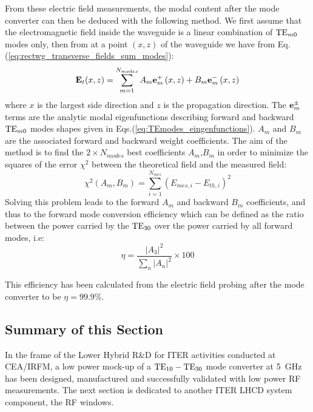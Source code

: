 From these electric field measurements, the modal content after the mode converter can then be deduced with the following method. We first assume that the electromagnetic field inside the waveguide is a linear combination of ${\mathrm{TE}}_{m0}$ modes only, then from at a point $(x,z)$ of the waveguide we have from Eq.(\ref{eq:rectwg_transverse_fields_sum_modes}):
\begin{equation}
{\mathbf E}_{t}(x,z)
	=
	\sum_{m=1}^{N_{modes}}
	A_{m} {\mathbf e}_{m}^{+} \left(x,z\right) + B_{m} {\mathbf e}_{m}^{-} \left(x,z\right) 
\end{equation}
where $x$ is the largest side direction and $z$ is the propagation direction. The ${\mathbf e}_{m}^{\pm}$ terms are the analytic modal eigenfunctions describing forward and backward ${\mathrm{TE}}_{m0}$ modes shapes given in Eqs.(\ref{eq:TEmodes_eingenfunctions}). $A_{m}$ and $B_{m}$ are the associated forward and backward weight coefficients.  The aim of the method is to find the $2\times N_{modes}$ best coefficients $A_{m}$,$B_{m}$  in order to minimize the squares of the error $\chi^{2}$ between the theoretical field and the measured field:
\begin{equation}
\chi^{2}\left(A_{m},B_{m}\right)=\sum_{i=1}^{N_{mes}}\left(E_{mes,i}-E_{th,i}\right)^{2} 
\end{equation}
Solving this problem leads to the forward $A_{m}$ and backward $B_{m}$ coefficients, and thus to the forward mode conversion efficiency which can be defined as the ratio between the power carried by the ${\mathrm{TE}}_{30}$ over the power carried by all forward modes, i.e:
\begin{equation}
\eta=\frac{\left|A_{3}\right|^{2}}{\sum_{n}\left|A_{n}\right|^{2}}\times100
\end{equation}

This efficiency has been calculated from the electric field probing after the mode converter to be $\eta=99.9$\%. 



\subsection{Summary of this Section}
In the frame of the Lower Hybrid R\&D for ITER activities conducted at CEA/IRFM, a low power mock-up of a ${\mathrm{TE}}_{10}-{\mathrm{TE}}_{30}$ mode converter at 5~GHz has been designed, manufactured and successfully validated with low power RF measurements. The next section is dedicated to another ITER LHCD system component, the RF windows.  

